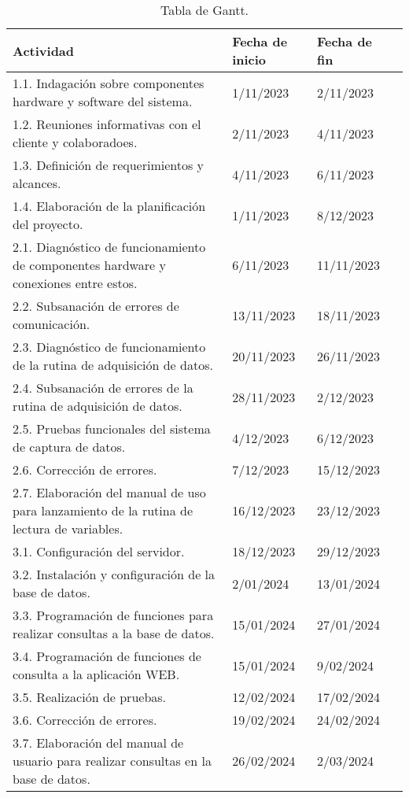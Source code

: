 \documentclass[
11pt, %
codirector, %
]{charter}
\begin{document}
\begin{table}[ht]
\caption{Tabla de Gantt.}
\label{tab:Gantt}
\begin{tabularx}{\linewidth}{@{}|l|X|X|l|@{}}
\hline
\rowcolor[HTML]{C0C0C0} 
Actividad & Fecha de inicio & Fecha de fin \\ \hline
1.1. Indagación sobre componentes hardware y software del sistema. & 1/11/2023 & 2/11/2023 \\ \hline
1.2. Reuniones informativas con el cliente y colaboradoes. & 2/11/2023 & 4/11/2023 \\ \hline 
1.3. Definición de requerimientos y alcances. & 4/11/2023 & 6/11/2023 \\ \hline 
1.4. Elaboración de la planificación del proyecto. & 1/11/2023 & 8/12/2023 \\ \hline 
2.1. Diagnóstico de funcionamiento de componentes hardware y conexiones entre estos. & 6/11/2023 & 11/11/2023 \\ \hline 
2.2. Subsanación de errores de comunicación. & 13/11/2023 & 18/11/2023 \\ \hline
2.3. Diagnóstico de funcionamiento de la rutina de adquisición de datos. & 20/11/2023 & 26/11/2023 \\ \hline
2.4. Subsanación de errores de la rutina de adquisición de datos. & 28/11/2023 & 2/12/2023 \\ \hline
2.5. Pruebas funcionales del sistema de captura de datos. & 4/12/2023 & 6/12/2023 \\ \hline
2.6. Corrección de errores. & 7/12/2023 & 15/12/2023 \\ \hline
2.7. Elaboración del manual de uso para lanzamiento de la rutina de lectura de variables. & 16/12/2023 & 23/12/2023 \\ \hline
3.1. Configuración del servidor. & 18/12/2023 & 29/12/2023 \\ \hline
3.2. Instalación y configuración de la base de datos. &	2/01/2024 & 13/01/2024 \\ \hline
3.3. Programación de funciones para realizar consultas a la base de datos. & 15/01/2024 & 27/01/2024 \\ \hline
3.4. Programación de funciones de consulta a la aplicación WEB. & 15/01/2024 & 9/02/2024 \\ \hline
3.5. Realización de pruebas. & 12/02/2024 & 17/02/2024 \\ \hline
3.6. Corrección de errores. & 19/02/2024 & 24/02/2024 \\ \hline
3.7. Elaboración del manual de usuario para realizar consultas en la base de datos. & 26/02/2024 & 2/03/2024 \\ \hline

\end{tabularx}
\end{table}
\end{document}
